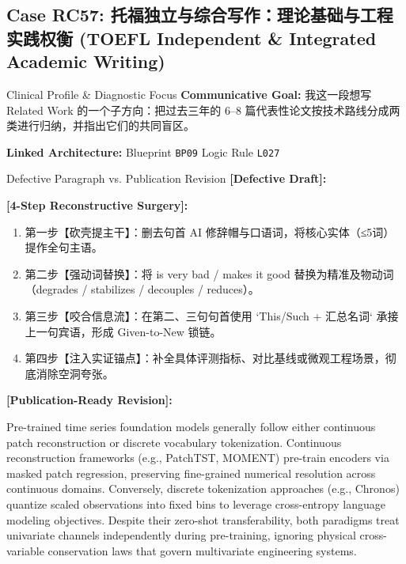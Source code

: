 \subsection{Case RC57: 托福独立与综合写作：理论基础与工程实践权衡 (TOEFL Independent \& Integrated Academic Writing)}\label{case:RC57}
\begin{ConceptBox}{Clinical Profile \& Diagnostic Focus}
\textbf{Communicative Goal:} 我这一段想写 Related Work 的一个子方向：把过去三年的 6--8 篇代表性论文按技术路线分成两类进行归纳，并指出它们的共同盲区。\par
\textbf{Linked Architecture:} Blueprint \texttt{BP09} \enspace\textbar\enspace Logic Rule \texttt{L027}
\end{ConceptBox}
\begin{ExampleBox}{Defective Paragraph vs. Publication Revision}
\textbf{\color{TargetHighlight}[Defective Draft]:}\par
{}\par\vspace{6pt}
\textbf{\color{AcadForest}[4-Step Reconstructive Surgery]:}
\begin{enumerate}[label=\textbf{\color{AcadNavy}Step \arabic*:}, leftmargin=2em]
  \item 第一步【砍壳提主干】：删去句首 AI 修辞帽与口语词，将核心实体（≤5词）提作全句主语。
  \item 第二步【强动词替换】：将 is very bad / makes it good 替换为精准及物动词（degrades / stabilizes / decouples / reduces）。
  \item 第三步【咬合信息流】：在第二、三句句首使用 `This/Such + 汇总名词` 承接上一句宾语，形成 Given-to-New 锁链。
  \item 第四步【注入实证锚点】：补全具体评测指标、对比基线或微观工程场景，彻底消除空洞夸张。
\end{enumerate}\vspace{4pt}
\textbf{\color{AcadNavy}[Publication-Ready Revision]:}\par
Pre-trained time series foundation models generally follow either continuous patch reconstruction or discrete vocabulary tokenization. Continuous reconstruction frameworks (e.g., PatchTST, MOMENT) pre-train encoders via masked patch regression, preserving fine-grained numerical resolution across continuous domains. Conversely, discrete tokenization approaches (e.g., Chronos) quantize scaled observations into fixed bins to leverage cross-entropy language modeling objectives. Despite their zero-shot transferability, both paradigms treat univariate channels independently during pre-training, ignoring physical cross-variable conservation laws that govern multivariate engineering systems.
\end{ExampleBox}
